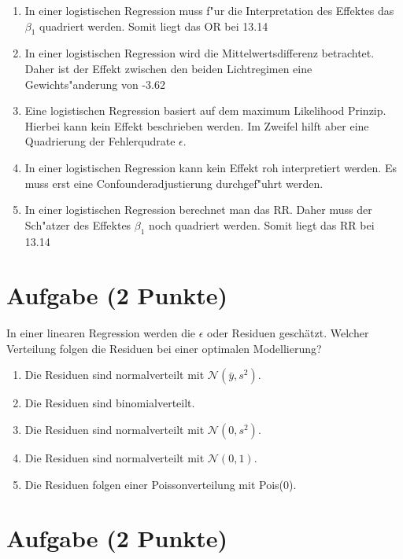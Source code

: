 \documentclass[a4paper, 10pt]{scrartcl}\usepackage[]{graphicx}\usepackage[]{xcolor}
\begin{document}
\begin{enumerate}
\item [\textbf{A} \msquare] In einer logistischen Regression muss f{"u}r die Interpretation des Effektes das $\beta_1$ quadriert werden. Somit liegt das OR bei 13.14
\item [\textbf{B} \msquare] In einer logistischen Regression wird die Mittelwertsdifferenz betrachtet. Daher ist der Effekt zwischen den beiden Lichtregimen eine Gewichts{"a}nderung von -3.62
\item [\textbf{C} \msquare] Eine logistischen Regression basiert auf dem maximum Likelihood Prinzip. Hierbei kann kein Effekt beschrieben werden. Im Zweifel hilft aber eine Quadrierung der Fehlerqudrate $\epsilon$.
\item [\textbf{D} \msquare] In einer logistischen Regression kann kein Effekt roh interpretiert werden. Es muss erst eine Confounderadjustierung durchgef{"u}hrt werden.
\item [\textbf{E} \msquare] In einer logistischen Regression berechnet man das RR. Daher muss der Sch{"a}tzer des Effektes $\beta_1$ noch quadriert werden. Somit liegt das RR bei 13.14
\end{enumerate}

\section{Aufgabe \hfill (2 Punkte)}

In einer linearen Regression werden die $\epsilon$ oder Residuen
gesch{\"a}tzt. Welcher Verteilung folgen die Residuen bei einer optimalen
Modellierung? 



\begin{enumerate}
\item [\textbf{A} \msquare] Die Residuen sind normalverteilt mit $\mathcal{N}(\bar{y}, s^2)$.
\item [\textbf{B} \msquare] Die Residuen sind binomialverteilt.
\item [\textbf{C} \msquare] Die Residuen sind normalverteilt mit $\mathcal{N}(0, s^2)$.
\item [\textbf{D} \msquare] Die Residuen sind normalverteilt mit $\mathcal{N}(0, 1)$.
\item [\textbf{E} \msquare] Die Residuen folgen einer Poissonverteilung mit Pois(0).
\end{enumerate}

\section{Aufgabe \hfill (2 Punkte)}
\end{document}
